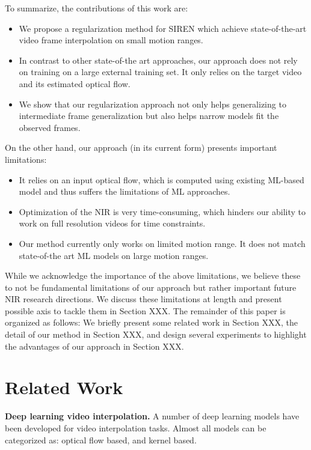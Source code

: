 \documentclass{article}
\begin{document}
To summarize, the contributions of this work are:
\begin{itemize}
\item We propose a regularization method for SIREN which achieve state-of-the-art video frame interpolation on small motion ranges.
\item In contrast to other state-of-the art approaches, our approach does not rely on training on a large external training set.
It only relies on the target video and its estimated optical flow.
\item We show that our regularization approach not only helps generalizing to intermediate frame generalization
but also helps narrow models fit the observed frames.
\end{itemize}

On the other hand, our approach (in its current form) presents important limitations:

\begin{itemize}
\item It relies on an input optical flow, which is computed using existing ML-based model and thus suffers the limitations of ML approaches.
\item Optimization of the NIR is very time-consuming, which hinders our ability to work on full resolution videos for time constraints.
\item Our method currently only works on limited motion range. It does not match state-of-the art ML models on large motion ranges.
\end{itemize}

While we acknowledge the importance of the above limitations,
we believe these to not be fundamental limitations of our approach but rather important future NIR research directions.
We discuss these limitations at length and present possible axis to tackle them in Section XXX.
The remainder of this paper is organized as follows:
We briefly present some related work in Section XXX, the detail of our method in Section XXX,
and design several experiments to highlight the advantages of our approach in Section XXX.

\section{Related Work}

\textbf{Deep learning video interpolation.}
A number of deep learning models have been developed for video interpolation tasks.
Almost all models can be categorized as: optical flow based, and kernel based.
\end{document}
